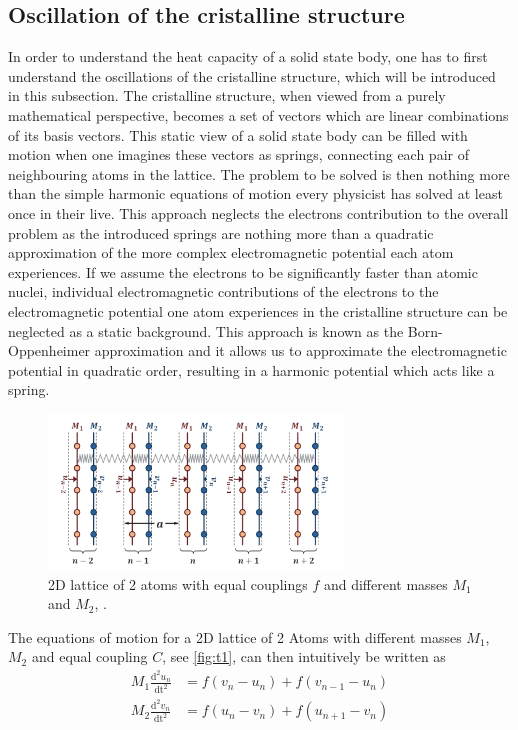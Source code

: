 \subsection{Oscillation of the cristalline structure}
In order to understand the heat capacity of a solid state body, one has to first understand the oscillations of the cristalline structure, which will be introduced in this subsection.
The cristalline structure, when viewed from a purely mathematical perspective, becomes a set of vectors which are linear combinations of its basis vectors. This static view of a solid state body can be filled with motion when one imagines these vectors as springs, connecting each pair of neighbouring atoms in the lattice. The problem to be solved is then nothing more than the simple harmonic equations of motion every physicist has solved at least once in their live.
This approach neglects the electrons contribution to the overall problem as the introduced springs are nothing more than a quadratic approximation of the more complex electromagnetic potential each atom experiences. If we assume the electrons to be significantly faster than atomic nuclei, individual electromagnetic contributions of the electrons to the electromagnetic potential one atom experiences in the cristalline structure can be neglected as a static background.
This approach is known as the Born-Oppenheimer approximation and it allows us to approximate the electromagnetic potential in quadratic order, resulting in a harmonic potential which acts like a spring.
\begin{figure}[H]
    \centering
    \includegraphics[width=0.7\textwidth]{lattice.pdf}
    \caption{2D lattice of 2 atoms with equal couplings $f$ and different masses $M_1$ and $M_2$, \cite{rehab}.}
    \label{fig:t1}
\end{figure}
\noindent
The equations of motion for a 2D lattice of 2 Atoms with different masses $M_1$, $M_2$ and equal coupling $C$, see \autoref{fig:t1}, can then intuitively be written as 
\begin{align}
    M_1 \frac{\text{d}^2 u_n}{\text{dt}^2} &= f \left( v_n - u_n \right) + f \left( v_{n-1} - u_n \right) \\
    M_2 \frac{\text{d}^2 v_n}{\text{dt}^2} &= f \left( u_n - v_n \right) + f \left( u_{n+1} - v_n \right)
\end{align}
